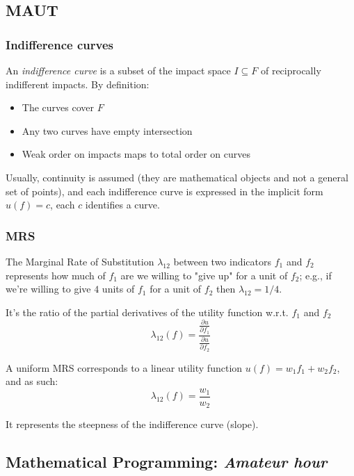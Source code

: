 \subsection{MAUT}

\subsubsection{Indifference curves}

An \textit{indifference curve} is a subset of the impact space $I \subseteq F$ of reciprocally indifferent impacts. By definition: 
\begin{itemize}
	\item The curves cover $F$
	
	\item Any two curves have empty intersection
	
	\item Weak order on impacts maps to total order on curves
\end{itemize}

Usually, continuity is assumed (they are mathematical objects and not a general set of points), and each indifference curve is expressed in the implicit form $ u(f) = c$, each $c$ identifies a curve.


\subsubsection{MRS}

The Marginal Rate of Substitution $\lambda_{12}$ between two indicators $f_1$ and $f_2$ represents how much of $f_1$ are we willing to "give up" for a unit of $f_2$; e.g., if we're willing to give $4$ units of $f_1$ for a unit of $f_2$ then $\lambda_{12} = 1/4$.

It's the ratio of the partial derivatives of the utility function w.r.t. $f_1$ and $f_2$
$$ \lambda_{12} (f) = \frac{ \frac{\partial u }{\partial f_1} }{ \frac{\partial u}{\partial f_2} } $$

A uniform MRS corresponds to a linear utility function $u(f) = w_1 f_1 + w_2 f_2$, and as such:
$$ \lambda_{12} (f) = \frac{w_1}{w_2} $$

It represents the steepness of the indifference curve (slope).

\subsection{Mathematical Programming: \textit{Amateur hour}}

